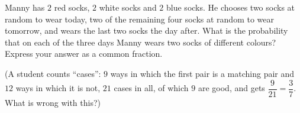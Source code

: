 Manny has $2$ red socks, $2$ white socks and $2$ blue socks. He chooses two socks at random to wear today, two of the remaining four socks at random to wear tomorrow, and wears the last two socks the day after. What is the probability that on each of the three days Manny wears two socks of different colours? Express your answer as a common fraction.

(A student counts ``cases'': $9$ ways in which the first pair is a matching pair and $12$ ways in which it is not, $21$ cases in all, of which $9$ are good, and gets $\dfrac{9}{21}=\dfrac{3}{7}$. What is wrong with this?)
